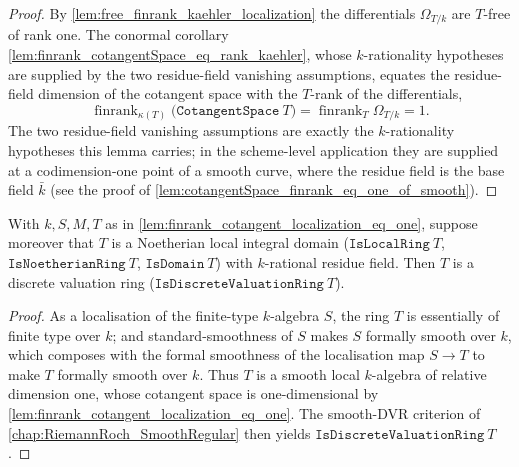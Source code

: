 \begin{proof}
        \leanok
  By \cref{lem:free_finrank_kaehler_localization} the differentials
  \(\Omega_{T/k}\) are \(T\)-free of rank one. The conormal corollary
  \cref{lem:finrank_cotangentSpace_eq_rank_kaehler},
  whose \(k\)-rationality hypotheses are supplied by the two residue-field
  vanishing assumptions, equates the residue-field dimension of the cotangent
  space with the \(T\)-rank of the differentials,
  \[
    \operatorname{finrank}_{\kappa(T)}
      \bigl(\texttt{CotangentSpace}\ T\bigr)
    = \operatorname{finrank}_T \Omega_{T/k} = 1.
  \]
  The two residue-field vanishing assumptions are exactly the \(k\)-rationality
  hypotheses this lemma carries; in the scheme-level application they are
  supplied at a codimension-one point of a smooth curve, where the residue
  field is the base field \(\bar k\) (see the proof of
  \cref{lem:cotangentSpace_finrank_eq_one_of_smooth}).
\end{proof}

\begin{lemma}
  \label{lem:isDVR_localization_standardSmooth}
  With \(k, S, M, T\) as in \cref{lem:finrank_cotangent_localization_eq_one},
  suppose moreover that \(T\) is a Noetherian local integral domain
  (\(\texttt{IsLocalRing}\ T\), \(\texttt{IsNoetherianRing}\ T\),
  \(\texttt{IsDomain}\ T\)) with \(k\)-rational residue field. Then \(T\) is a
  discrete valuation ring (\(\texttt{IsDiscreteValuationRing}\ T\)).
\end{lemma}

\begin{proof}
  \leanok
  As a localisation of the finite-type \(k\)-algebra \(S\), the ring \(T\) is
  essentially of finite type over \(k\); and standard-smoothness of \(S\) makes
  \(S\) formally smooth over \(k\), which composes with the formal smoothness of
  the localisation map \(S \to T\) to make \(T\) formally smooth over \(k\). Thus
  \(T\) is a smooth local \(k\)-algebra of relative dimension one, whose
  cotangent space is one-dimensional by
  \cref{lem:finrank_cotangent_localization_eq_one}. The smooth-DVR criterion
  of \cref{chap:RiemannRoch_SmoothRegular} then yields
  \(\texttt{IsDiscreteValuationRing}\ T\).
\end{proof}

